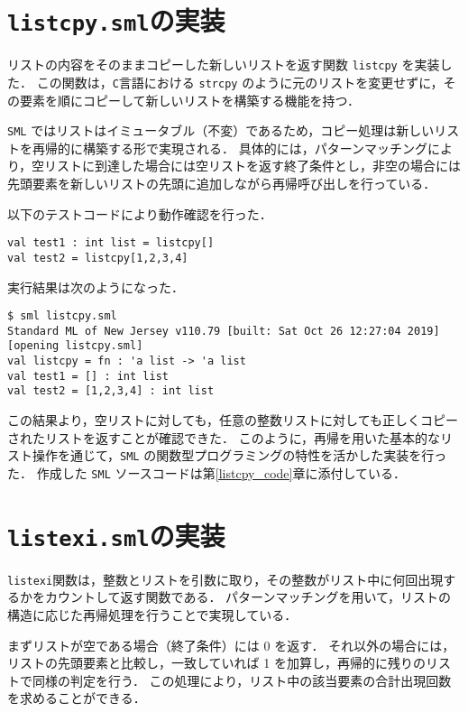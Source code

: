 \documentclass[autodetect-engine,dvi=dvipdfmx,ja=standard,
               a4j,11pt]{bxjsarticle}
\begin{document}
\section{\texttt{listcpy.sml}の実装}
リストの内容をそのままコピーした新しいリストを返す関数 \verb|listcpy| を実装した．
この関数は，\verb|C|言語における \verb|strcpy| のように元のリストを変更せずに，その要素を順にコピーして新しいリストを構築する機能を持つ．

\verb|SML| ではリストはイミュータブル（不変）であるため，コピー処理は新しいリストを再帰的に構築する形で実現される．
具体的には，パターンマッチングにより，空リストに到達した場合には空リストを返す終了条件とし，非空の場合には先頭要素を新しいリストの先頭に追加しながら再帰呼び出しを行っている．

以下のテストコードにより動作確認を行った．
\begin{Verbatim}
val test1 : int list = listcpy[]
val test2 = listcpy[1,2,3,4]  
\end{Verbatim}
実行結果は次のようになった．
\begin{Verbatim}
$ sml listcpy.sml
Standard ML of New Jersey v110.79 [built: Sat Oct 26 12:27:04 2019]
[opening listcpy.sml]
val listcpy = fn : 'a list -> 'a list
val test1 = [] : int list
val test2 = [1,2,3,4] : int list    
\end{Verbatim}

この結果より，空リストに対しても，任意の整数リストに対しても正しくコピーされたリストを返すことが確認できた．
このように，再帰を用いた基本的なリスト操作を通じて，\verb|SML| の関数型プログラミングの特性を活かした実装を行った．
作成した \verb|SML| ソースコードは第\ref{listcpy_code}章に添付している．
\section{\texttt{listexi.sml}の実装}
\texttt{listexi}関数は，整数とリストを引数に取り，その整数がリスト中に何回出現するかをカウントして返す関数である．
パターンマッチングを用いて，リストの構造に応じた再帰処理を行うことで実現している．

まずリストが空である場合（終了条件）には 0 を返す．
それ以外の場合には，リストの先頭要素と比較し，一致していれば 1 を加算し，再帰的に残りのリストで同様の判定を行う．
この処理により，リスト中の該当要素の合計出現回数を求めることができる．
\end{document}
